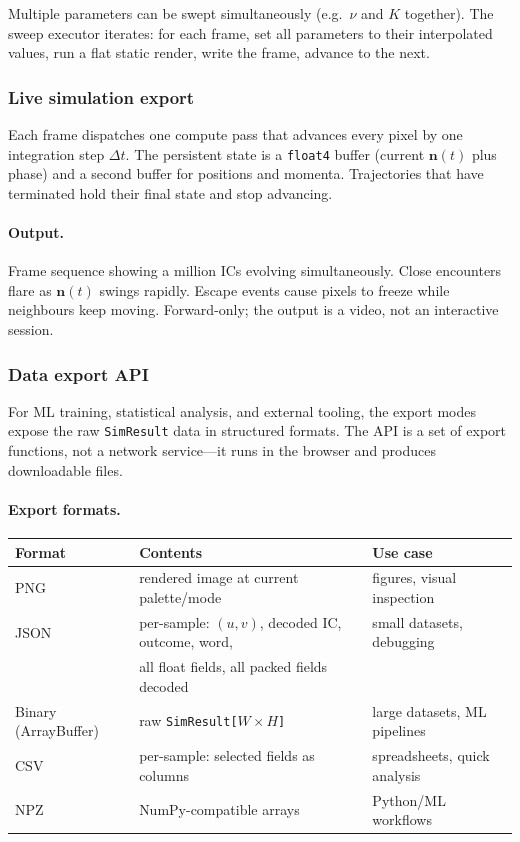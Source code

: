 \documentclass[11pt]{report}
\begin{document}
Multiple parameters can be swept simultaneously (e.g.\ $\nu$ and $K$ together). The sweep executor iterates: for each frame, set all parameters to their interpolated values, run a flat static render, write the frame, advance to the next.


\subsubsection{Live simulation export}

Each frame dispatches one compute pass that advances every pixel by one integration step $\Delta t$. The persistent state is a \texttt{float4} buffer (current $\mathbf n(t)$ plus phase) and a second buffer for positions and momenta. Trajectories that have terminated hold their final state and stop advancing.

\paragraph{Output.} Frame sequence showing a million ICs evolving simultaneously. Close encounters flare as $\mathbf n(t)$ swings rapidly. Escape events cause pixels to freeze while neighbours keep moving. Forward-only; the output is a video, not an interactive session.


\subsubsection{Data export API}
\label{sec:data_api}

For ML training, statistical analysis, and external tooling, the export modes expose the raw \texttt{SimResult} data in structured formats. The API is a set of export functions, not a network service---it runs in the browser and produces downloadable files.

\paragraph{Export formats.}

\begin{center}
\begin{tabular}{lll}
\toprule
Format & Contents & Use case \\
\midrule
PNG & rendered image at current palette/mode & figures, visual inspection \\
JSON & per-sample: $(u,v)$, decoded IC, outcome, word, & small datasets, debugging \\
 & all float fields, all packed fields decoded & \\
Binary (ArrayBuffer) & raw \texttt{SimResult[$W \times H$]} & large datasets, ML pipelines \\
CSV & per-sample: selected fields as columns & spreadsheets, quick analysis \\
NPZ & NumPy-compatible arrays & Python/ML workflows \\
\bottomrule
\end{tabular}
\end{center}
\end{document}
